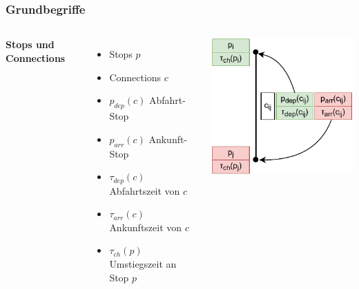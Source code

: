 \documentclass[aspectratio=169]{beamer}
\begin{document}
\begin{frame}
\frametitle{Grundbegriffe}
\begin{columns}[c] %
	
	\textbf{Stops und Connections}
	\begin{itemize}
		\item Stops $p$
		\item Connections $c$
		\item $p_{dep}(c)$ Abfahrt-Stop
		\item $p_{arr}(c)$ Ankunft-Stop
		\item $\tau_{dep}(c)$ Abfahrtszeit von $c$
		\item $\tau_{arr}(c)$ Ankunftszeit von $c$
		\item $\tau_{ch}(p)$ Umstiegszeit an Stop $p$
	\end{itemize}
	\includegraphics[scale=0.9]{connection.pdf}	
\end{columns}
\end{frame}

\end{document}
